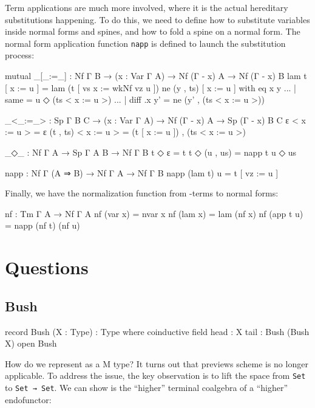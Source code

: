 Term applications are much more involved, where it is the actual hereditary substitutions happening. To do this, we need to define how to substitute variables inside normal forms and spines, and how to fold a spine on a normal form. The normal form application function \texttt{napp} is defined to launch the substitution process:

\begin{code}[hide]
mutual
  _[_:=_] : Nf Γ B → (x : Var Γ A) → Nf (Γ - x) A → Nf (Γ - x) B
  lam t [ x := u ] = lam (t [ vs x := wkNf vz u ])
  ne (y , ts) [ x := u ] with eq x y
  ... | same = u ◇ (ts < x := u >)
  ... | diff .x y' = ne (y' , (ts < x := u >))

  _<_:=_> : Sp Γ B C → (x : Var Γ A) → Nf (Γ - x) A → Sp (Γ - x) B C
  ε < x := u > = ε
  (t , ts) < x := u > = (t [ x := u ]) , (ts < x := u >)

  _◇_ : Nf Γ A → Sp Γ A B → Nf Γ B
  t ◇ ε = t
  t ◇ (u , us) = napp t u ◇ us
\end{code}

\begin{code}
  napp : Nf Γ (A ⇒ B) → Nf Γ A → Nf Γ B
  napp (lam t) u = t [ vz := u ]
\end{code}

Finally, we have the normalization function from \lambda-terms to normal forms:

\begin{code}
nf : Tm Γ A → Nf Γ A
nf (var x) = nvar x
nf (lam x) = lam (nf x)
nf (app t u) = napp (nf t) (nf u)
\end{code}

\section{Questions}

\subsection{Bush}

\begin{code}
record Bush (X : Type) : Type where
  coinductive
  field
    head : X
    tail : Bush (Bush X)
open Bush
\end{code}

How do we represent   as a M type? It turns out that previews scheme is no longer applicable. To address the issue, the key observation is to lift the space from \texttt{Set} to \texttt{Set → Set}. We can show  is the ``higher'' terminal coalgebra of a ``higher'' endofunctor:

